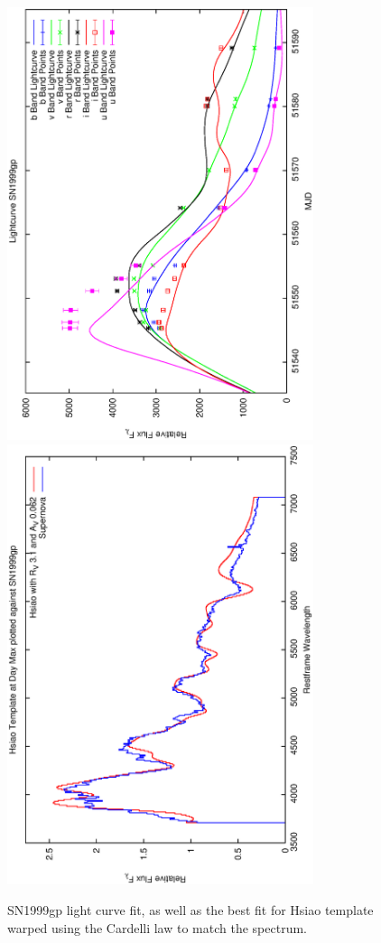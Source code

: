 \clearpage

\begin{figure}[p]
\centering
\includegraphics[angle=-90,width=0.8\textwidth]{./figures/ltcv/SN1999gp_v024_lightcurve.ps}
\hfill
\includegraphics[angle=-90,width=0.8\textwidth]{./figures/hsiao/SN1999gp_v001_hsiao.ps}
\hfill
\caption{SN1999gp light curve fit, as well as the best fit for Hsiao template warped using the Cardelli law to match the spectrum.}
\label{fig:SN1999gpfour2}
\end{figure}

